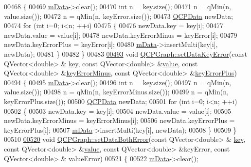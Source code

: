 \begin{DoxyCode}
00468 \{
00469   \hyperlink{a00031_a8457c840f69a0ac49f61d30a509c5d08}{mData}->clear();
00470   \textcolor{keywordtype}{int} n = key.size();
00471   n = qMin(n, value.size());
00472   n = qMin(n, keyError.size());
00473   \hyperlink{a00030_d2/d94/a00184}{QCPData} newData;
00474   \textcolor{keywordflow}{for} (\textcolor{keywordtype}{int} i=0; i<n; ++i)
00475   \{
00476     newData.key = key[i];
00477     newData.value = value[i];
00478     newData.keyErrorMinus = keyError[i];
00479     newData.keyErrorPlus = keyError[i];
00480     \hyperlink{a00031_a8457c840f69a0ac49f61d30a509c5d08}{mData}->insertMulti(key[i], newData);
00481   \}
00482 \}
00483 
\hypertarget{a00115_source_l00493}{}\hyperlink{a00031_ac15c749c5fedf740d5692c6fe67143b8}{00493} \textcolor{keywordtype}{void} \hyperlink{a00031_abce9f07c0d722bc3e4fa7bd73c7e5dfa}{QCPGraph::setDataKeyError}(\textcolor{keyword}{const} QVector<double> &
      \hyperlink{a00116_a94bb892c30911cd62cba0707a5395be4}{key}, \textcolor{keyword}{const} QVector<double> &\hyperlink{a00116_aee90379adb0307effb138f4871edbc5c}{value}, \textcolor{keyword}{const} QVector<double> &\hyperlink{a00116_a7d90a6258f6d24ad254245076e5beac7}{keyErrorMinus}, \textcolor{keyword}{const} 
      QVector<double> &\hyperlink{a00116_a1d47938cd7209297ef861cf01816d89f}{keyErrorPlus})
00494 \{
00495   \hyperlink{a00031_a8457c840f69a0ac49f61d30a509c5d08}{mData}->clear();
00496   \textcolor{keywordtype}{int} n = key.size();
00497   n = qMin(n, value.size());
00498   n = qMin(n, keyErrorMinus.size());
00499   n = qMin(n, keyErrorPlus.size());
00500   \hyperlink{a00030_d2/d94/a00184}{QCPData} newData;
00501   \textcolor{keywordflow}{for} (\textcolor{keywordtype}{int} i=0; i<n; ++i)
00502   \{
00503     newData.key = key[i];
00504     newData.value = value[i];
00505     newData.keyErrorMinus = keyErrorMinus[i];
00506     newData.keyErrorPlus = keyErrorPlus[i];
00507     \hyperlink{a00031_a8457c840f69a0ac49f61d30a509c5d08}{mData}->insertMulti(key[i], newData);
00508   \}
00509 \}
00510 
\hypertarget{a00115_source_l00520}{}\hyperlink{a00031_a873fe46bdb20be5710428e474ade8908}{00520} \textcolor{keywordtype}{void} \hyperlink{a00031_a873fe46bdb20be5710428e474ade8908}{QCPGraph::setDataBothError}(\textcolor{keyword}{const} QVector<double> &
      \hyperlink{a00116_a94bb892c30911cd62cba0707a5395be4}{key}, \textcolor{keyword}{const} QVector<double> &\hyperlink{a00116_aee90379adb0307effb138f4871edbc5c}{value}, \textcolor{keyword}{const} QVector<double> &keyError, \textcolor{keyword}{const} QVector<double> &
      valueError)
00521 \{
00522   \hyperlink{a00031_a8457c840f69a0ac49f61d30a509c5d08}{mData}->clear();

\end{DoxyCode}
